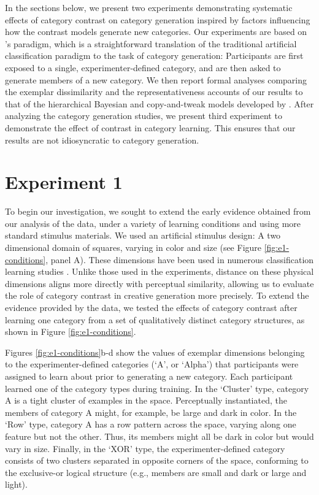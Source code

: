 \documentclass[12pt]{article}
\begin{document}
\begin{flushleft}
In the sections below, we present two experiments demonstrating systematic effects of category contrast on category generation inspired by factors influencing how the contrast models generate new categories. Our experiments are based on \cite{jern2013probabilistic}'s paradigm, which is a straightforward translation of the traditional artificial classification paradigm to the task of category generation: Participants are first exposed to a single, experimenter-defined category, and are then asked to generate members of a new category. We then report formal analyses comparing the exemplar dissimilarity and the representativeness accounts of our results to that of the hierarchical Bayesian and copy-and-tweak models developed by \cite{jern2013probabilistic}. After analyzing the category generation studies, we present third experiment to demonstrate the effect of contrast in category learning. This ensures that our results are not idiosyncratic to category generation.

\section{Experiment 1}

To begin our investigation, we sought to extend the early evidence obtained from our analysis of the \cite{jern2013probabilistic} data, under a variety of learning conditions and using more standard stimulus materials. We used an artificial stimulus design: A two dimensional domain of squares, varying in color and size (see Figure \ref{fig:e1-conditions}, panel A). These dimensions have been used in numerous classification learning studies \cite[e.g.,][]{conaway2016similar,conaway2016generalization,shepard1961learning,nosofsky1994comparing}. Unlike those used in the \cite{jern2013probabilistic} experiments, distance on these physical dimensions aligns more directly with perceptual similarity, allowing us to evaluate the role of category contrast in creative generation more precisely. To extend the evidence provided by the \cite{jern2013probabilistic} data, we tested the effects of category contrast after learning one category from a set of qualitatively distinct category structures, as shown in Figure \ref{fig:e1-conditions}. 

Figures \ref{fig:e1-conditions}b-d show the values of exemplar dimensions belonging to the experimenter-defined categories (`A', or `Alpha') that participants were assigned to learn about prior to generating a new category. Each participant learned one of the category types during training. In the `Cluster' type, category A is a tight cluster of examples in the space. Perceptually instantiated, the members of category A might, for example, be large and dark in color. In the `Row' type, category A has a row pattern across the space, varying along one feature but not the other. Thus, its members might all be dark in color but would vary in size. Finally, in the `XOR' type, the experimenter-defined category consists of two clusters separated in opposite corners of the space, conforming to the exclusive-or logical structure (e.g., members are small and dark or large and light). 


\end{flushleft}
\end{document}
